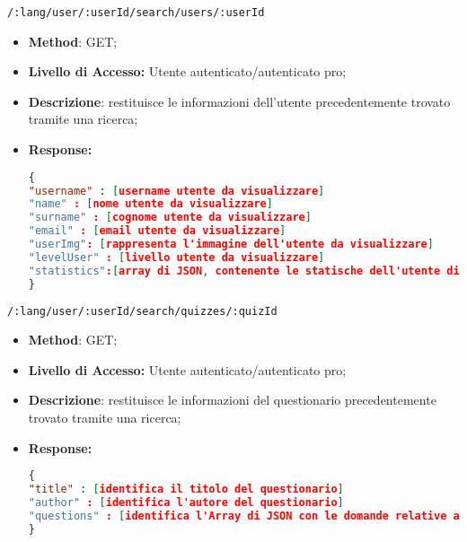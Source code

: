 	\item \texttt{/:lang/user/:userId/search/users/:userId}
	 \begin{itemize}
	 	\item \textbf{Method}: GET;
	 	\item \textbf{Livello di Accesso:} Utente autenticato/autenticato pro;
	 	\item \textbf{Descrizione}: restituisce le informazioni dell'utente precedentemente trovato tramite una ricerca;
	 	\item \textbf{Response:} 
\begin{lstlisting}[language=json,firstnumber=1]
{
"username" : [username utente da visualizzare]
"name" : [nome utente da visualizzare]
"surname" : [cognome utente da visualizzare]
"email" : [email utente da visualizzare]
"userImg": [rappresenta l'immagine dell'utente da visualizzare]
"levelUser" : [livello utente da visualizzare]
"statistics":[array di JSON, contenente le statische dell'utente di ogni argomento]
}
\end{lstlisting}
	 \end{itemize}
	 
	 
	\item \texttt{/:lang/user/:userId/search/quizzes/:quizId}
	\begin{itemize}
		\item \textbf{Method}: GET;
		\item \textbf{Livello di Accesso:} Utente autenticato/autenticato pro;
		\item \textbf{Descrizione}: restituisce le informazioni del questionario precedentemente trovato tramite una ricerca;
		\item \textbf{Response:} 
\begin{lstlisting}[language=json,firstnumber=1]
{
"title" : [identifica il titolo del questionario]
"author" : [identifica l'autore del questionario]
"questions" : [identifica l'Array di JSON con le domande relative al questionario]
}
\end{lstlisting}
	\end{itemize}